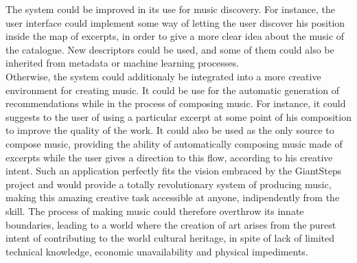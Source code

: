 The system could be improved in its use for music discovery. For instance, the user interface could implement some way of letting the user discover his position inside the map of excerpts, in order to give a more clear idea about the music of the catalogue. New descriptors could be used, and some of them could also be inherited from metadata or machine learning processes. \\ \vspace{2cm}
Otherwise, the system could additionaly be integrated into a more creative environment for creating music. It could be use for the automatic generation of recommendations while in the process of composing music. For instance, it could suggests to the user of using a particular excerpt at some point of his composition to improve the quality of the work. It could also be used as the only source to compose music, providing the ability of automatically composing music made of excerpts while the user gives a direction to this flow, according to his creative intent. Such an application perfectly fits the vision embraced by the GiantSteps project and would provide a totally revolutionary system of producing music, making this amazing creative task accessible at anyone, indipendently from the skill. The process of making music could therefore overthrow its innate boundaries, leading to a world where the creation of art arises from the purest intent of contributing to the world cultural heritage, in spite of lack of limited technical knowledge, economic unavailability and physical impediments.
